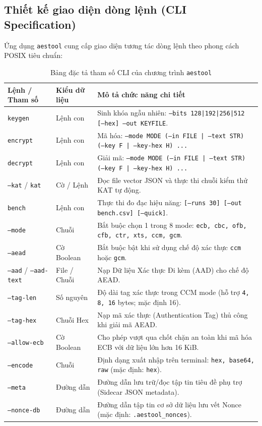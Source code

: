\documentclass[12pt, a4paper]{report}
\begin{document}
\subsection{Thiết kế giao diện dòng lệnh (CLI Specification)}
Ứng dụng \texttt{aestool} cung cấp giao diện tương tác dòng lệnh theo phong cách POSIX tiêu chuẩn:

\begin{table}[H]
\centering
\small
\caption{Bảng đặc tả tham số CLI của chương trình \texttt{aestool}}
\label{tab:cli}
\begin{tabular}{p{2.8cm} p{2.2cm} p{9.0cm}}
\toprule
\textbf{Lệnh / Tham số} & \textbf{Kiểu dữ liệu} & \textbf{Mô tả chức năng chi tiết} \\
\midrule
\texttt{keygen} & Lệnh con & Sinh khóa ngẫu nhiên: \texttt{--bits 128|192|256|512 [--hex] --out KEYFILE}. \\
\texttt{encrypt} & Lệnh con & Mã hóa: \texttt{--mode MODE (--in FILE | --text STR) (--key F | --key-hex H) ...} \\
\texttt{decrypt} & Lệnh con & Giải mã: \texttt{--mode MODE (--in FILE | --text STR) (--key F | --key-hex H) ...} \\
\texttt{--kat} / \texttt{kat} & Cờ / Lệnh & Đọc file vector JSON và thực thi chuỗi kiểm thử KAT tự động. \\
\texttt{bench} & Lệnh con & Thực thi đo đạc hiệu năng: \texttt{[--runs 30] [--out bench.csv] [--quick]}. \\
\texttt{--mode} & Chuỗi & Bắt buộc chọn 1 trong 8 mode: \texttt{ecb, cbc, ofb, cfb, ctr, xts, ccm, gcm}. \\
\texttt{--aead} & Cờ Boolean & Bắt buộc bật khi sử dụng chế độ xác thực \texttt{ccm} hoặc \texttt{gcm}. \\
\texttt{--aad} / \texttt{--aad-text} & File / Chuỗi & Nạp Dữ liệu Xác thực Đi kèm (AAD) cho chế độ AEAD. \\
\texttt{--tag-len} & Số nguyên & Độ dài tag xác thực trong CCM mode (hỗ trợ \texttt{4, 8, 16} bytes; mặc định 16). \\
\texttt{--tag-hex} & Chuỗi Hex & Nạp mã xác thực (Authentication Tag) thủ công khi giải mã AEAD. \\
\texttt{--allow-ecb} & Cờ Boolean & Cho phép vượt qua chốt chặn an toàn khi mã hóa ECB với dữ liệu lớn hơn 16 KiB. \\
\texttt{--encode} & Chuỗi & Định dạng xuất nhập trên terminal: \texttt{hex, base64, raw} (mặc định: \texttt{hex}). \\
\texttt{--meta} & Đường dẫn & Đường dẫn lưu trữ/đọc tập tin tiêu đề phụ trợ (Sidecar JSON metadata). \\
\texttt{--nonce-db} & Đường dẫn & Đường dẫn tập tin cơ sở dữ liệu lưu vết Nonce (mặc định: \texttt{.aestool\_nonces}). \\
\bottomrule
\end{tabular}
\end{table}
\end{document}
